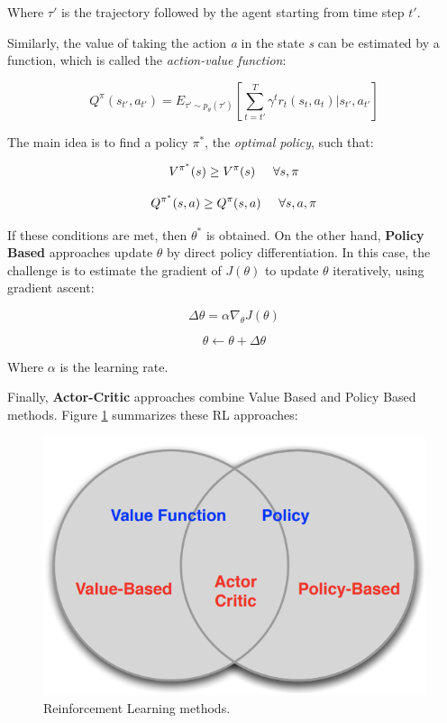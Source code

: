 Where $\tau'$ is the trajectory followed by the agent starting from time step $t'$.

Similarly, the value of taking the action \emph{a} in the state \emph{s} can be estimated by a function, which is called the \emph{action-value function}:

\begin{equation}
    Q^{\pi}(s_{t'}, a_{t'})  = E_{\tau' \sim p_{\theta}(\tau')}\left[\sum_{t=t'}^{T}\gamma^{t}r_{t}(s_{t}, a_{t})|s_{t'},a_{t'}\right]
\end{equation}

The main idea is to find a policy $\pi^{*}$, the \emph{optimal policy}, such that:

\begin{equation}
    V^{\pi^{*}}(s) \geq V^{\pi}(s) \hspace{0.5cm} \forall s, \pi
\end{equation}

\begin{equation}
    Q^{\pi^{*}}(s,a) \geq Q^{\pi}(s,a) \hspace{0.5cm} \forall s,a,\pi
\end{equation}

If these conditions are met, then $\theta^{*}$ is obtained. On the other hand, \textbf{Policy Based} approaches update $\theta$ by direct policy differentiation. In this case, the challenge is to estimate the gradient of $J(\theta)$ to update $\theta$ iteratively, using gradient ascent:

\begin{equation}
    \Delta \theta = \alpha \nabla_{\theta}J(\theta)
\end{equation}

\begin{equation}
    \theta \leftarrow \theta + \Delta \theta
\end{equation}

Where $\alpha$ is the learning rate.

Finally, \textbf{Actor-Critic} approaches combine Value Based and Policy Based methods. Figure \ref{fig:rl_summ} summarizes these RL approaches:

\begin{figure}[h]
    \centering
    \includegraphics[width=0.5\linewidth]{imagenes/cap1/rl_summary.png}
    \caption{Reinforcement Learning methods.\protect\footnotemark}
    \label{fig:rl_summ}
\end{figure}

